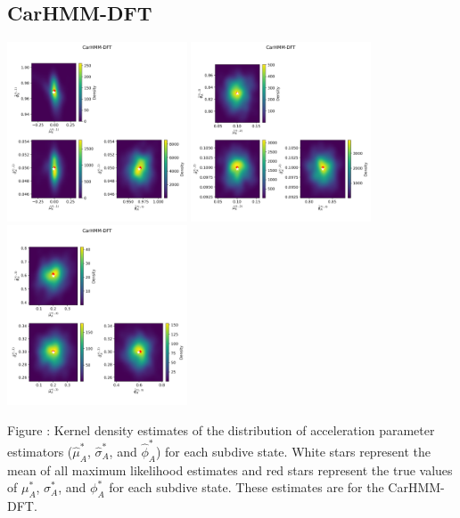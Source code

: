 \documentclass{article}
\begin{document}
        \subsection{CarHMM-DFT}
        \begin{center}
        \includegraphics[width=2.1in]{../Plots/hmm_FV_MLE_density_A_0_0.png}
        \includegraphics[width=2.1in]{../Plots/hmm_FV_MLE_density_A_0_1.png}
        \includegraphics[width=2.1in]{../Plots/hmm_FV_MLE_density_A_0_2.png}
        \end{center}
        
        \noindent Figure : Kernel density estimates of the distribution of acceleration parameter estimators ($\hat \mu^*_A$, $\hat \sigma^*_A$, and $\hat \phi^*_A$) for each subdive state. White stars represent the mean of all maximum likelihood estimates and red stars represent the true values of $\mu^*_A$, $\sigma^*_A$, and $\phi^*_A$ for each subdive state. These estimates are for the CarHMM-DFT.
        \addtocounter{fignum}{1}
        
\end{document}
